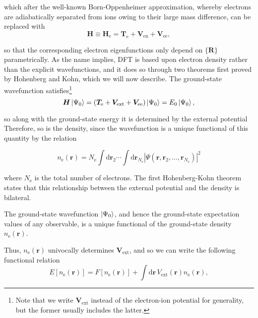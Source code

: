which after the well-known Born-Oppenheimer approximation\parencite{Martin2004}, whereby electrons are adiabatically separated from ions owing to their large mass difference, can be replaced with
\begin{equation}
\label{bo}
\bm{H}\equiv\bm H_{\mathrm e} = \bm T_{\mathrm e} + \bm V_{\mathrm{en}}+\bm V_{\mathrm{ee}},
\end{equation}


so that the corresponding electron eigenfunctions only depend on \(\{\bm R\}\) parametrically. As the name implies, DFT is based upon electron density rather than the explicit wavefunctions, and it does so through two theorems first proved by Hohenberg and Kohn\parencite{Martin2004}, which we will now describe. The ground-state wavefunction satisfies\footnote{Note that we write \(\bm V_{\mathrm{ext}}\) instead of the electron-ion potential for generality, but the former usually includes the latter.}
\begin{equation}
\bm H \ket{\Psi_0}=(\bm T_{\mathrm e} + \bm V_{\mathrm{ext}}+\bm V_{\mathrm{ee}})\ket{\Psi_0}=E_0\ket{\Psi_0},
\end{equation}

so along with the ground-state energy it is determined by the external potential Therefore, so is the density, since the wavefunction is a unique functional of this quantity by the relation\parencite{Solyom2010}

\begin{equation}
	n_{\mathrm{e}}(\bm{r})=N_{\mathrm{e}} \int \mathrm{d} \bm{r}_{2} \cdots \int \mathrm{d} \bm{r}_{N_{\mathrm{e}}}\left|\Psi\left(\bm{r}, \bm{r}_{2}, \ldots, \bm{r}_{N_{\mathrm{e}}}\right)\right|^{2}
\end{equation}

where \(N_{\mathrm{e}}\) is the total number of electrons. The first Hohenberg-Kohn theorem states that this relationship between the external potential and the density is bilateral.

\begin{theorem}
The ground-state wavefunction \(\ket{\Psi_0}\), and hence the ground-state expectation values of any observable, is a unique functional of the ground-state density \(n_{\mathrm e}(\bm{r})\).
\end{theorem}

Thus, \(n_{\mathrm e}(\bm r)\) univocally determines \(\bm V_{\mathrm{ext}}\), and so we can write the following functional relation
\begin{equation}
	\label{en-fal}
	E\left[n_{\mathrm{e}}(\bm{r})\right]=F\left[n_{\mathrm{e}}(\bm{r})\right]+\int\mathrm{d} \bm{r}\, V_{\mathrm{ext}}(\bm{r}) n_{\mathrm{e}}(\bm{r}),
\end{equation}

